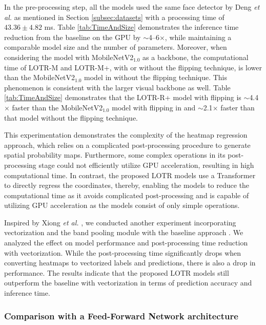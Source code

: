 \documentclass[journal]{IEEEtran}
\begin{document}
In the pre-processing step, all the models used the same face detector by Deng \textit{et al.} \cite{deng2019} as mentioned in Section \ref{subsec:datasets} with a processing time of $43.36\pm4.82$ ms.
Table \ref{tab:TimeAndSize} demonstrates the inference time reduction from the baseline on the GPU by $\sim$4--6$\times$, while maintaining a comparable model size and the number of parameters.
Moreover, when considering the model with MobileNetV2$_{1.0}$ as a backbone, the computational time of LOTR-M and LOTR-M+, with or without the flipping technique, is lower than the MobileNetV2$_{1.0}$ model in \cite{earp2021sub} without the flipping technique. 
This phenomenon is consistent with the larger visual backbone as well.
Table \ref{tab:TimeAndSize} demonstrates that the LOTR-R+ model with flipping is $\sim$4.4$\times$ faster than the MobileNetV2$_{1.0}$ model with flipping in \cite{earp2021sub} and $\sim$2.1$\times$ faster than that model without the flipping technique.

This experimentation demonstrates the complexity of the heatmap regression approach, which relies on a complicated post-processing procedure to generate spatial probability maps. 
Furthermore, some complex operations in its post-processing stage could not efficiently utilize GPU acceleration, resulting in high computational time. 
In contrast, the proposed LOTR models use a Transformer to directly regress the coordinates, thereby, enabling the models to reduce the computational time as it avoids complicated post-processing and is capable of utilizing GPU acceleration as the models consist of only simple operations.

Inspired by Xiong \textit{et al.} \cite{xiong2020}, we conducted another experiment incorporating vectorization and the band pooling module with the baseline approach \cite{earp2021sub}.
We analyzed the effect on model performance and post-processing time reduction with vectorization.
While the post-processing time significantly drops when converting heatmaps to vectorized labels and predictions, there is also a drop in performance. 
The results indicate that the proposed LOTR models still outperform the baseline with vectorization in terms of prediction accuracy and inference time.



\subsubsection{Comparison with a Feed-Forward Network architecture}\label{subsubsec:ablation_mlp}
\end{document}
